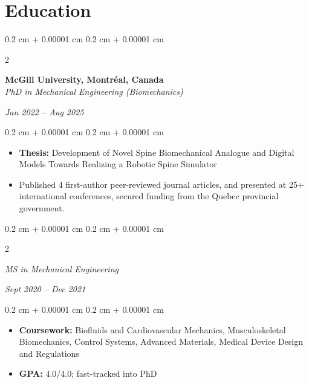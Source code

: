 \documentclass[10pt, letterpaper]{article}
\newenvironment{highlights}{
    \begin{itemize}[
        topsep=0.10 cm,
        parsep=0.10 cm,
        partopsep=0pt,
        itemsep=0pt,
        leftmargin=0.4 cm + 10pt
    ]
}{
    \end{itemize}
} %
\newenvironment{onecolentry}{
    \begin{adjustwidth}{
        0.2 cm + 0.00001 cm
    }{
        0.2 cm + 0.00001 cm
    }
}{
    \end{adjustwidth}
} %
\newenvironment{twocolentry}[2][]{
    \onecolentry
    \def\secondColumn{#2}
    \setcolumnwidth{\fill, 4.5 cm}
    \begin{paracol}{2}
}{
    \switchcolumn \raggedleft \secondColumn
    \end{paracol}
    \endonecolentry
} %
\begin{document}
\section{Education}

\begin{twocolentry}{\textit{Jan 2022 – Aug 2025}}
    \textbf{McGill University, Montréal, Canada} \\
    \textit{PhD in Mechanical Engineering (Biomechanics)}
\end{twocolentry}
\vspace{0.1cm}
\begin{onecolentry}
    \begin{highlights}
        \item \textbf{Thesis:} Development of Novel Spine Biomechanical Analogue and Digital Models Towards Realizing a Robotic Spine Simulator
        \item Published 4 first-author peer-reviewed journal articles, and presented at 25+ international conferences, secured funding from the Quebec provincial government.
    \end{highlights}
\end{onecolentry}

\vspace{0.2cm}

\begin{twocolentry}{\textit{Sept 2020 – Dec 2021}}
    \textit{MS in Mechanical Engineering}
\end{twocolentry}
\vspace{0.1cm}
\begin{onecolentry}
    \begin{highlights}
        \item \textbf{Coursework:} Biofluids and Cardiovascular Mechanics, Musculoskeletal Biomechanics, Control Systems, Advanced Materials, Medical Device Design and Regulations
        \item \textbf{GPA:} 4.0/4.0; fast-tracked into PhD
    \end{highlights}
\end{onecolentry}

\vspace{0.2cm}
\end{document}
